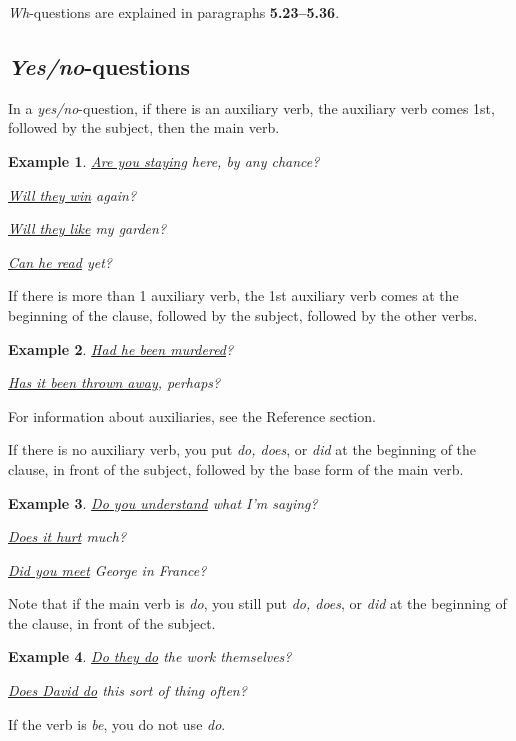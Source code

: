 \documentclass[oneside]{book}
\numberwithin{equation}{section}
\newtheorem{example}{Example}[section]
\begin{document}
%
\textit{Wh}-questions are explained in paragraphs \textbf{5.23--5.36}.

\subsection{\textit{Yes/no}-questions}
\noindent{} In a \textit{yes/no}-question, if there is an auxiliary verb, the auxiliary verb comes 1st, followed by the subject, then the main verb.
\begin{example}
    \underline{Are you staying} here, by any chance?
    
    \underline{Will they win} again?
    
    \underline{Will they like} my garden?
    
    \underline{Can he read} yet?
\end{example}
If there is more than 1 auxiliary verb, the 1st auxiliary verb comes at the beginning of the clause, followed by the subject, followed by the other verbs.
\begin{example}
    \underline{Had he been murdered}?
    
    \underline{Has it been thrown away}, perhaps?
\end{example}
For information about auxiliaries, see the Reference section.

%
\noindent{} If there is no auxiliary verb, you put \textit{do, does}, or \textit{did} at the beginning of the clause, in front of the subject, followed by the base form of the main verb.
\begin{example}
    \underline{Do you understand} what I'm saying?
    
    \underline{Does it hurt} much?
    
    \underline{Did you meet} George in France?
\end{example}
Note that if the main verb is \textit{do}, you still put \textit{do, does}, or \textit{did} at the beginning of the clause, in front of the subject.
\begin{example}
    \underline{Do they do} the work themselves?
    
    \underline{Does David do} this sort of thing often?
\end{example}
%
\noindent{} If the verb is \textit{be}, you do not use \textit{do}.
\end{document}
